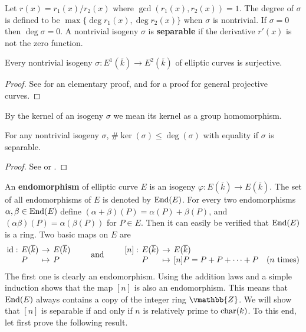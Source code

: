 Let $r(x) = r_1(x) / r_2(x)$ where $\gcd(r_1(x), r_2(x)) = 1$. The degree of $\sigma$ is defined to 
be $\max\{ \deg r_1(x), \deg r_2(x)\}$ when $\sigma$ is nontrivial. If $\sigma = 0$ then $\deg 
\sigma = 0$. A nontrivial isogeny $\sigma$ is \textbf{separable} if the derivative $r'(x)$ is not 
the zero function.
\begin{lemma}
Every nontrivial isogeny $\sigma: E^1(\overline{k}) \rightarrow E^2(\overline{k})$ of elliptic 
curves is surjective.
\end{lemma}
\begin{proof}
See \cite{Washington2008} for an elementary proof, and \cite{Fulton2008} for a proof for general 
projective curves.
\end{proof}
By the kernel of an isogeny $\sigma$ we mean its kernel as a group homomorphism.
\begin{proposition}
\label{proposition:iso-ker}
For any nontrivial isogeny $\sigma$, $\#\ker(\sigma) \le \deg(\sigma)$ with equality if $\sigma$ is 
separable. 
\end{proposition}
\begin{proof}
See \cite[Sec. 3.4]{Silverman2009} or \cite{Washington2008}.
\end{proof}
An \textbf{endomorphism} of elliptic curve $E$ is an isogeny $\varphi: E(\overline{k}) \rightarrow 
E(\overline{k})$. The set of all endomorphisms of $E$ is denoted by $\operatorname{End}(E)$. For every two 
endomorphisms $\alpha, \beta \in \operatorname{End}(E)$ define $(\alpha + \beta)(P) = \alpha(P) + \beta(P)$, 
and $(\alpha\beta)(P) = \alpha(\beta(P))$ for $P \in E$. Then it can easily be verified that 
$\operatorname{End}(E)$ is a ring. Two basic maps on $E$ are
$$
\setlength\arraycolsep{2pt}
\begin{array}{llll}
\text{id}: & E(\overline{k}) & \rightarrow & E(\overline{k}) \\
& P & \mapsto & P
\end{array}
\qquad
\text{ and }
\qquad
\begin{array}{llll}
[n]: & E(\overline{k}) & \rightarrow & E(\overline{k}) \\
& P & \mapsto & [n]P = P + P + \cdots + P \quad (n \text{ times})
\end{array}
$$
The first one is clearly an endomorphism. Using the addition laws and a simple induction shows that 
the map $[n]$ is also an endomorphism. This means that $\operatorname{End}(E)$ always contains a copy of the 
integer ring $\vmathbb{Z}$. We will show that $[n]$ is separable if and only if $n$ is relatively 
prime to $\operatorname{char}(k)$. To this end, let first prove the following result.

